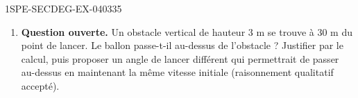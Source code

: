 \begin{exercice}{1SPE-SECDEG-EX-040}{3}{35}
\begin{enumerate}
  \item \textbf{Question ouverte.} Un obstacle vertical de hauteur $3$ m se trouve à $30$ m du point de lancer. Le ballon passe-t-il au-dessus de l'obstacle ? Justifier par le calcul, puis proposer un angle de lancer différent qui permettrait de passer au-dessus en maintenant la même vitesse initiale (raisonnement qualitatif accepté).
\end{enumerate}
\end{exercice}
